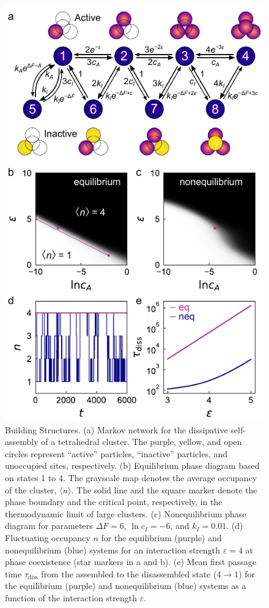 \begin{appendices}
\begin{figure}[h!]
    \centering
    \includegraphics{figures/A5_BuildingStructures.pdf}
    \caption{Building Structures. (a) Markov network for the dissipative self-assembly of a tetrahedral cluster. The purple, yellow, and open circles represent ``active'' particles, ``inactive'' particles, and unoccupied sites, respectively. (b) Equilibrium phase diagram based on states 1 to 4. The grayscale map denotes the average occupancy of the cluster, $\langle n\rangle$. The solid line and the square marker denote the phase boundary and the critical point, respectively, in the thermodynamic limit of large clusters. (c) Nonequilibrium phase diagram for parameters $\Delta F=6$, $\ln c_I = -6$, and $k_I = 0.01$.  (d) Fluctuating occupancy $n$ for the equilibrium (purple) and nonequilibrium (blue) systems for an interaction strength $\varepsilon=4$ at phase coexistence (star markers in a and b). (e) Mean first passage time $\tau_{\text{diss}}$ from the assembled to the disassembled state ($4\rightarrow1$) for the equilibrium (purple) and nonequilibrium (blue) systems as a function of the interaction strength $\varepsilon$. }
    \label{fig:BuildingStructures}
\end{figure}


\end{appendices}
